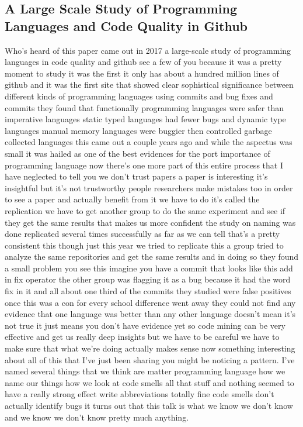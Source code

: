 \documentclass[conference, compsoc, twoside]{IEEEtran}
\begin{document}
\subsection{A Large Scale Study of Programming Languages and Code Quality in Github}
Who's heard of this paper came out in 2017 a large-scale study of programming languages in code quality and github see a few of you because it was a pretty moment to study it was the first it only has about a hundred million lines of github and it was the first site that showed clear sophistical significance between different kinds of programming languages using commits and bug fixes and commits they found that functionally programming languages were safer than imperative languages static typed languages had fewer bugs and dynamic type languages manual memory languages were buggier then controlled garbage collected languages this came out a couple years ago and while the aspectus was small it was hailed as one of the best evidences for the port importance of programming language now there's one more part of this entire process that I have neglected to tell you we don't trust papers a paper is interesting it's insightful but it's not trustworthy people researchers make mistakes too in order to see a paper and actually benefit from it we have to do it's called the replication we have to get another group to do the same experiment and see if they get the same results that makes us more confident the study on naming was done replicated several times successfully as far as we can tell that's a pretty consistent this though just this year we tried to replicate this a group tried to analyze the same repositories and get the same results and in doing so they found a small problem you see this imagine you have a commit that looks like this add in fix operator the other group was flagging it as a bug because it had the word fix in it and all about one third of the commits they studied were false positives once this was a con for every school difference went away they could not find any evidence that one language was better than any other language doesn't mean it's not true it just means you don't have evidence yet so code mining can be very effective and get us really deep insights but we have to be careful we have to make sure that what we're doing actually makes sense now something interesting about all of this that I've just been sharing you might be noticing a pattern. 
I've named several things that we think are matter programming language how we name our things how we look at code smells all that stuff and nothing seemed to have a really strong effect write abbreviations totally fine code smells don't actually identify bugs it turns out that this talk is what we know we don't know and we know we don't know pretty much anything.  
\end{document}
